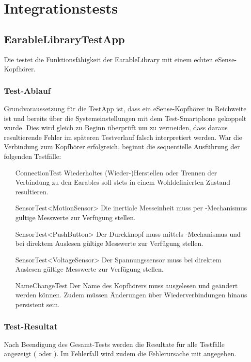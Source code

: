 \documentclass[../implementierung.tex]{subfiles}
\begin{document}
\section{Integrationstests}

\subsection{EarableLibraryTestApp}

	Die  testet die Funktionsfähigkeit der EarableLibrary mit einem echten eSense-Kopfhörer.

	\subsubsection{Test-Ablauf}
		Grundvoraussetzung für die TestApp ist, dass ein eSense-Kopfhörer in Reichweite ist und bereits über die Systemeinstellungen mit dem Test-Smartphone gekoppelt wurde.
		Dies wird gleich zu Beginn überprüft um zu vermeiden, dass daraus resultierende Fehler im späteren Testverlauf falsch interpretiert werden.
		War die Verbindung zum Kopfhörer erfolgreich, beginnt die sequentielle Ausführung der folgenden Testfälle:
		\begin{itemize}
			\item[ConnectionTest] Wiederholtes (Wieder-)Herstellen oder Trennen der Verbindung zu den Earables soll stets in einem Wohldefinierten Zustand resultieren.
			\item[SensorTest<MotionSensor>] Die inertiale Messeinheit muss per -Mechanismus gültige Messwerte zur Verfügung stellen.
			\item[SensorTest<PushButton>] Der Durckknopf muss mittels -Mechanismus und bei direktem Auslesen gültige Messwerte zur Verfügung stellen.
			\item[SensorTest<VoltageSensor>] Der Spannungssensor muss bei direktem Auslesen gültige Messwerte zur Verfügung stellen.
			\item[NameChangeTest] Der Name des Kopfhörers muss ausgelesen und geändert werden können. Zudem müssen Änderungen über Wiederverbindungen hinaus persistent sein.
		\end{itemize}

	\subsubsection{Test-Resultat}
		Nach Beendigung des Gesamt-Tests werden die Resultate für alle Testfälle angezeigt ( oder ).
		Im Fehlerfall wird zudem die Fehlerursache mit angegeben.
\end{document}
